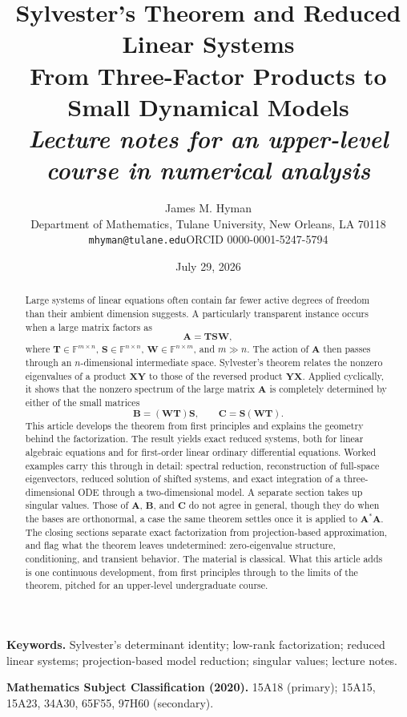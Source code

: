 \documentclass[11pt]{article}
\title{Sylvester's Theorem and Reduced Linear Systems\\
\large From Three-Factor Products to Small Dynamical Models\\[0.6em]
\normalsize\textit{Lecture notes for an upper-level course in numerical analysis}}
\author{James M. Hyman\\
  \small Department of Mathematics, Tulane University, New Orleans, LA 70118\\
  \small \texttt{mhyman@tulane.edu}\qquad ORCID 0000-0001-5247-5794}
\date{July 29, 2026}
\newcommand{\F}{\mathbb{F}}
\newcommand{\mat}[1]{\mathbf{#1}}
\theoremstyle{definition}
\theoremstyle{remark}
\begin{document}
\maketitle

\begin{abstract}
Large systems of linear equations often contain far fewer active degrees of freedom than their ambient dimension suggests. A particularly transparent instance occurs when a large matrix factors as
\[
  \mat{A}=\mat{T}\mat{S}\mat{W},
\]
where \(\mat{T}\in\F^{m\times n}\), \(\mat{S}\in\F^{n\times n}\), \(\mat{W}\in\F^{n\times m}\), and \(m\gg n\). The action of \(\mat{A}\) then passes through an \(n\)-dimensional intermediate space. Sylvester's theorem relates the nonzero eigenvalues of a product \(\mat{X}\mat{Y}\) to those of the reversed product \(\mat{Y}\mat{X}\). Applied cyclically, it shows that the nonzero spectrum of the large matrix \(\mat{A}\) is completely determined by either of the small matrices
\[
  \mat{B}=(\mat{W}\mat{T})\mat{S},
  \qquad
  \mat{C}=\mat{S}(\mat{W}\mat{T}).
\]
This article develops the theorem from first principles and explains the geometry behind the factorization. The result yields exact reduced systems, both for linear algebraic equations and for first-order linear ordinary differential equations. Worked examples carry this through in detail: spectral reduction, reconstruction of full-space eigenvectors, reduced solution of shifted systems, and exact integration of a three-dimensional ODE through a two-dimensional model. A separate section takes up singular values. Those of \(\mat{A}\), \(\mat{B}\), and \(\mat{C}\) do not agree in general, though they do when the bases are orthonormal, a case the same theorem settles once it is applied to \(\mat{A}^{*}\mat{A}\). The closing sections separate exact factorization from projection-based approximation, and flag what the theorem leaves undetermined: zero-eigenvalue structure, conditioning, and transient behavior. The material is classical. What this article adds is one continuous development, from first principles through to the limits of the theorem, pitched for an upper-level undergraduate course.
\end{abstract}

\medskip
\noindent\textbf{Keywords.} Sylvester's determinant identity; low-rank factorization; reduced linear systems; projection-based model reduction; singular values; lecture notes.

\medskip
\noindent\textbf{Mathematics Subject Classification (2020).} 15A18 (primary); 15A15, 15A23, 34A30, 65F55, 97H60 (secondary).
\end{document}
